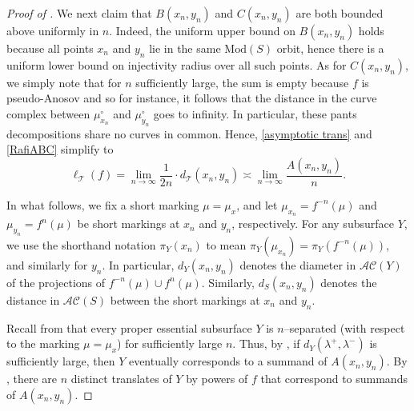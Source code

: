 \documentclass[11pt,letterpaper]{amsart}
\newcommand{\teich}{\mathcal T}
\numberwithin{equation}{section}
\theoremstyle{definition}
\newcommand{\Mod}{\mathrm{Mod}}
\newcommand{\AC}{\mathcal{AC}}
\begin{document}
\begin{proof}[Proof of ]
We next claim that $B(x_{n}, y_{n})$ and $C(x_{n}, y_{n})$ are both bounded above uniformly in $n$. Indeed, 
the uniform upper bound on $B(x_{n}, y_{n})$ holds because
all points $x_{n}$ and $y_{n}$ lie in the same $\Mod(S)$ orbit, hence there is a uniform lower bound on injectivity radius over all such points.
 As for $C(x_{n}, y_{n})$, we simply note that for $n$ sufficiently large, the sum is empty because $f$ is pseudo-Anosov and so for instance, it follows that the distance in the curve complex between $\mu^{\circ}_{x_{n}}$ and $\mu^{\circ}_{y_{n}}$ goes to infinity. In particular, these pants decompositions share no curves in common. 
%
Hence, \eqref{asymptotic trans} and \eqref{RafiABC} simplify to
\begin{equation} \label{A to T}
\ell_{\teich}(f) = \lim_{n \rightarrow \infty}\frac{1}{2n} \cdot d_{\teich} (x_{n}, y_{n}) 
\asymp \lim_{n\rightarrow \infty} \frac{A(x_{n}, y_{n})}{n}. 
\end{equation}

\smallskip

In what follows, we fix a short marking $\mu = \mu_x$, and let $\mu_{x_n} = f^{-n}(\mu)$ and $\mu_{y_n} = f^n(\mu)$ be short markings at $x_n$ and $y_n$, respectively. 
For any subsurface $Y$, we use the shorthand notation $\pi_Y(x_n)$ to mean $\pi_Y(\mu_{x_n}) = \pi_Y(f^{-n}(\mu))$, and similarly for $y_n$. In particular, $d_Y(x_n, y_n)$ denotes the diameter in $\AC(Y)$ of the projections of $f^{-n}(\mu) \cup f^n(\mu)$. Similarly, $d_S(x_n, y_n)$ denotes the distance in $\AC(S)$ between the short markings at $x_n$ and $y_n$.

Recall from  that every proper essential subsurface $Y$ is $n$--separated (with respect to the marking $\mu = \mu_x$) for sufficiently large $n$.
Thus, by ,  if $d_{Y}(\lambda^{+}, \lambda^{-})$ is sufficiently large, then  $Y$ eventually corresponds to a summand of $A(x_{n}, y_{n})$. By , there are $n$ distinct translates of $Y$ by powers of $f$ that correspond to summands of $A(x_n, y_n)$.



\end{proof}
\end{document}
